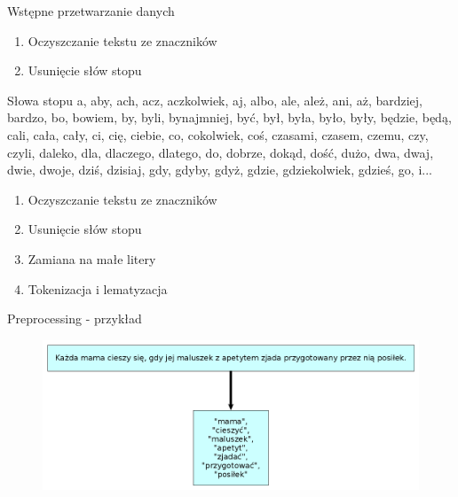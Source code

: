 \documentclass{beamer}
\begin{document}
	\begin{frame}{Wstępne przetwarzanie danych}
		\begin{enumerate}
			\item Oczyszczanie tekstu ze znaczników \pause
			\item Usunięcie słów stopu
		\end{enumerate}
	\end{frame}
	\begin{frame}{Słowa stopu}
		a, aby, ach, acz, aczkolwiek, aj, albo, ale, ależ, ani, aż, bardziej, bardzo, bo, bowiem, by, byli, bynajmniej, być, był, była, było, były, będzie, będą, cali, cała, cały, ci, cię, ciebie, co, cokolwiek, coś, czasami, czasem, czemu, czy, czyli, daleko, dla, dlaczego, dlatego, do, dobrze, dokąd, dość, dużo, dwa, dwaj, dwie, dwoje, dziś, dzisiaj, gdy, gdyby, gdyż, gdzie, gdziekolwiek, gdzieś, go, i...
	\end{frame}
	\begin{frame}
		\begin{enumerate}
			\item Oczyszczanie tekstu ze znaczników
			\item Usunięcie słów stopu \pause
			\item Zamiana na małe litery \pause
			\item Tokenizacja i lematyzacja %
		\end{enumerate}
	\end{frame}
	\begin{frame}{Preprocessing - przykład}
		\begin{figure}
			\centering
			\includegraphics[width=1\textwidth]{img/lemmatisation.png}
		\end{figure}
	\end{frame}
\end{document}
